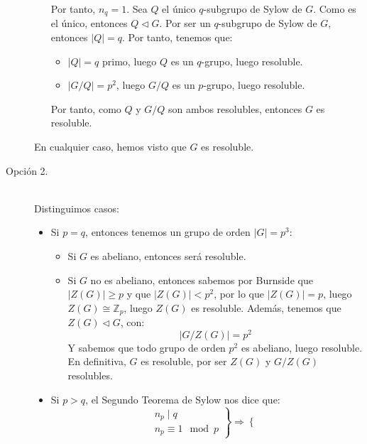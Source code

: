\begin{ejercicio}
\begin{description}
\begin{itemize}
        Por tanto, $n_q=1$. Sea $Q$ el único $q$-subgrupo de Sylow de $G$. Como es el único, entonces $Q\lhd G$. Por ser un $q$-subgrupo de Sylow de $G$, entonces $|Q|=q$. Por tanto, tenemos que:
        \begin{itemize}
            \item $|Q|=q$ primo, luego $Q$ es un $q$-grupo, luego resoluble.
            \item $|G/Q|=p^2$, luego $G/Q$ es un $p$-grupo, luego resoluble.
        \end{itemize}
        Por tanto, como $Q$ y $G/Q$ son ambos resolubles, entonces $G$ es resoluble.
    \end{itemize}
    
    En cualquier caso, hemos visto que $G$ es resoluble.
        \item [Opción 2.]~\\
            Distinguimos casos:
            \begin{itemize}
                \item Si $p = q$, entonces tenemos un grupo de orden $|G| = p^3$:
                    \begin{itemize}
                        \item Si $G$ es abeliano, entonces será resoluble.
                        \item Si $G$ no es abeliano, entonces sabemos por Burnside que $|Z(G)| \geq p$ y que $|Z(G)| < p^2$, por lo que $|Z(G)| = p$, luego $Z(G) \cong \mathbb{Z}_p$, luego $Z(G)$ es resoluble. Además, tenemos que $Z(G) \lhd G$, con:
                            \begin{equation*}
                                |G/Z(G)| = p^2
                            \end{equation*}
                            Y sabemos que todo grupo de orden $p^2$ es abeliano, luego resoluble. En definitiva, $G$ es resoluble, por ser $Z(G)$ y $G/Z(G)$ resolubles.
                    \end{itemize}
                \item Si $p>q$, el Segundo Teorema de Sylow nos dice que:
                    \begin{equation*}
                        \left.\begin{array}{r}
                            n_p \mid q \\
                            n_p \equiv 1 \mod p
                        \end{array}\right\} \Longrightarrow 
                        \left\{\begin{array}{r}

\end{array}
\end{equation*}
\end{itemize}
\end{description}
\end{ejercicio}
